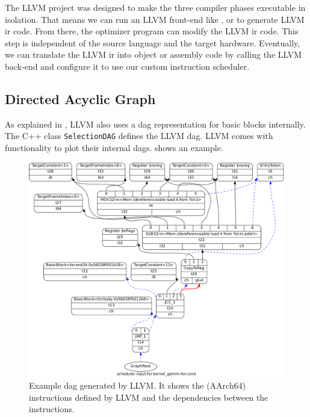 The LLVM project was designed to make the three compiler phases executable in isolation.
That means we can run an LLVM front-end like , or  to generate LLVM \ac{ir} code.
From there, the optimizer program  can modify the LLVM \ac{ir} code.
This step is independent of the source language and the target hardware.
Eventually, we can translate the LLVM \ac{ir} into object or assembly code by calling the LLVM back-end  and configure it to use our custom instruction scheduler.

\subsection{Directed Acyclic Graph}
As explained in , LLVM also uses a \ac{dag} representation for basic blocks internally.
The C++ class \lstinline|SelectionDAG| defines the LLVM \ac{dag}.
LLVM comes with functionality to plot their internal \acp{dag}.
 shows an example.
\begin{figure}
    \centering
    \includegraphics[width=\textwidth]{img/example-dag-crop.pdf}
    \caption[Example  generated by LLVM]{Example \ac{dag} generated by LLVM. It shows the (AArch64) instructions defined by LLVM and the dependencies between the instructions.}
    \label{fig:bg:llvm-dag}
\end{figure}

